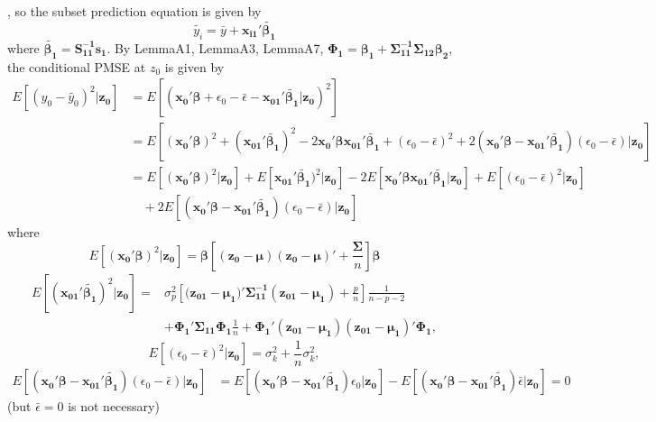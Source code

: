 \documentclass[11pt]{article}
\begin{document}
, so the subset prediction equation is given by $$\tilde{y_i}=\bar{y}+\boldsymbol{x_{i1}'\tilde{\beta_1}}$$ where $\boldsymbol{\tilde{\beta_1}=S_{11}^{-1}s_1}$. By LemmaA1, LemmaA3, LemmaA7, $\boldsymbol{\Phi_1=\beta_1+\Sigma^{-1}_{11}\Sigma_{12}\beta_2}$, the conditional PMSE at $z_0$ is given by 
$$
\begin{aligned}
E[(y_0-\tilde{y_0})^2|\boldsymbol{z_0}]
&=E[(\boldsymbol{x_{0}'\beta}+\epsilon_0-\bar{\epsilon}-\boldsymbol{x_{01}'\tilde{\beta_1}}|\boldsymbol{z_0})^2]\\
&= E[(\boldsymbol{x_0'\beta})^2+(\boldsymbol{x_{01}'\tilde{\beta_1}})^2-2\boldsymbol{x_0'\beta x_{01}'\tilde{\beta_1}}+(\epsilon_0-\bar{\epsilon})^2+2(\boldsymbol{x_0'\beta-x_{01}'\tilde{\beta_1}})(\epsilon_0-\bar{\epsilon})|\boldsymbol{z_0}]\\
&= E[(\boldsymbol{x_0'\beta})^2|\boldsymbol{z_0}]+E[\boldsymbol{x_{01}'\tilde{\beta_1}})^2|\boldsymbol{z_0}]-2E[\boldsymbol{x_0'\beta x_{01}'\tilde{\beta_1}|z_0}]+E[(\epsilon_0-\bar{\epsilon})^2|\boldsymbol{z_0}]\\
&\quad+2E[(\boldsymbol{x_0'\beta-x_{01}'\tilde{\beta_1}})(\epsilon_0-\bar{\epsilon})|\boldsymbol{z_0}]
\end{aligned}$$
where 
$$E[(\boldsymbol{x_0'\beta})^2|\boldsymbol{z_0}]=\boldsymbol{\beta}\left[\boldsymbol{(z_0-\mu)(z_0-\mu)'}+\frac{\boldsymbol{\Sigma}}{n}\right]\boldsymbol{\beta}$$
$$\begin{aligned}E[(\boldsymbol{x_{01}'\tilde{\beta_1}})^2|\boldsymbol{z_0}]
=&\sigma_p^2 \left[(\boldsymbol{z_{01}-\mu_1)'\Sigma_{11}^{-1}(z_{01}-\mu_1)}+\frac{p}{n}\right]\frac{1}{n-p-2}\\
&+\boldsymbol{\Phi_1'\Sigma_{11}\Phi_1}\frac{1}{n}+\boldsymbol{\Phi_{1}'(z_{01}-\mu_{1})(z_{01}-\mu_1)'\Phi_1},\label{LemmaA7}
\end{aligned}
$$
$$E[(\epsilon_0-\bar{\epsilon})^2|\boldsymbol{z_0}]=\sigma_k^2+\frac{1}{n}\sigma_k^2,$$
$$\begin{aligned}
E[(\boldsymbol{x_0'\beta-x_{01}'\tilde{\beta_1}})(\epsilon_0-\bar{\epsilon})|\boldsymbol{z_0}]
&=E[(\boldsymbol{x_0'\beta-x_{01}'\tilde{\beta_1}})\epsilon_0|\boldsymbol{z_0}]-E[(\boldsymbol{x_0'\beta-x_{01}'\tilde{\beta_1}})\bar{\epsilon}|\boldsymbol{z_0}]=0
\end{aligned}$$
(but $\bar{\epsilon}=0$ is not necessary)
\end{document}
